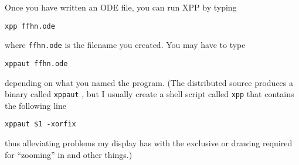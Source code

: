 \documentclass{article}
\begin{document}
Once you have written an ODE file, you can run XPP by typing
\begin{verbatim}
xpp ffhn.ode
\end{verbatim}
where {\tt ffhn.ode} is the filename you created.  You may have to
type
\begin{verbatim}
xppaut ffhn.ode
\end{verbatim}
depending on what you named the program. (The distributed source
produces a binary called {\tt xppaut} , but I usually create a shell
script called {\tt xpp} that contains the following line
\begin{verbatim}
xppaut $1 -xorfix
\end{verbatim}
thus alleviating problems my display has with the exclusive or drawing
required for ``zooming'' in and other things.)
\end{document}

